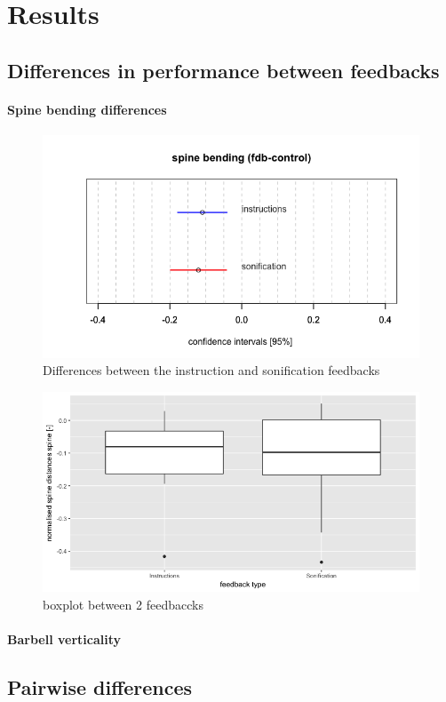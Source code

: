 \documentclass[10pt,letterpaper]{article}
\begin{document}
\section*{Results} \label{sec:results}



\subsection*{Differences in performance between feedbacks}


\paragraph{Spine bending differences}

\begin{figure}[!h]
\center
  \includegraphics[width=.5\textwidth]{figures/CI_spine_bending.png} 
  \caption{Differences between the instruction and sonification feedbacks} 
  \label{fig:boxplot}      
\end{figure}


\begin{figure}[!ht] 
    \includegraphics[width=.45\textwidth]{figures/boxplot.png}
\caption{boxplot between 2 feedbaccks}
\label{fig:boxplot} 
\end{figure}


\paragraph{Barbell verticality}








\subsection*{Pairwise differences}
\end{document}
